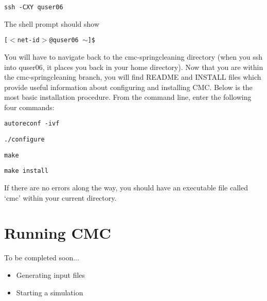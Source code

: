 \documentclass[11pt]{article}
\begin{document}
\begin{itemize}
{\addtolength{\leftskip}{10mm} 
\texttt{ssh -CXY quser06}

}
The shell prompt should show

{\addtolength{\leftskip}{10mm} 
\texttt{[$<$net-id$>$@quser06 $\sim$]\$}

}
You will have to navigate back to the cmc-springcleaning directory (when you ssh into quser06, it places you back in your home directory). 
Now that you are within the cmc-springcleaning branch, you will find README and INSTALL files which provide useful information about configuring and installing CMC. Below is the most basic installation procedure. From the command line, enter the following four commands:

{\addtolength{\leftskip}{10mm} \texttt{autoreconf -ivf}

\texttt{./configure}

\texttt{make}

\texttt{make install}

}
%
%
%

If there are no errors along the way, you should have an executable file called `cmc' within your current directory.

\end{itemize}



\section{Running CMC}
To be completed soon...
\begin{itemize}
\item Generating input files
\item Starting a simulation
\end{itemize}
\end{document}
